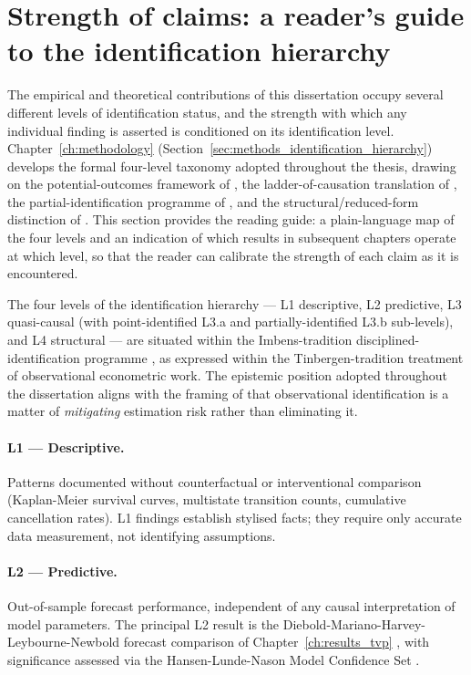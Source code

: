 \section{Strength of claims: a reader's guide to the identification hierarchy}
\label{sec:ch1-claims-structure}

The empirical and theoretical contributions of this dissertation occupy several different levels of identification status, and the strength with which any individual finding is asserted is conditioned on its identification level. Chapter~\ref{ch:methodology} (Section~\ref{sec:methods_identification_hierarchy}) develops the formal four-level taxonomy adopted throughout the thesis, drawing on the potential-outcomes framework of \cite{rubin1974estimating, holland1986statistics, imbens2015causal}, the ladder-of-causation translation of \cite{pearl2009causality, imbens2020potential}, the partial-identification programme of \cite{manski2003partial}, and the structural/reduced-form distinction of \cite{heckman2007econometric}. This section provides the reading guide: a plain-language map of the four levels and an indication of which results in subsequent chapters operate at which level, so that the reader can calibrate the strength of each claim as it is encountered.

The four levels of the identification hierarchy --- L1 descriptive, L2 predictive, L3 quasi-causal (with point-identified L3.a and partially-identified L3.b sub-levels), and L4 structural --- are situated within the Imbens-tradition disciplined-identification programme \cite{imbens2018causal}, as expressed within the Tinbergen-tradition treatment of observational econometric work. The epistemic position adopted throughout the dissertation aligns with the framing of \cite{blasques2024mitigating} that observational identification is a matter of \emph{mitigating} estimation risk rather than eliminating it.

\paragraph{L1 --- Descriptive.} Patterns documented without counterfactual or interventional comparison (Kaplan-Meier survival curves, multistate transition counts, cumulative cancellation rates). L1 findings establish stylised facts; they require only accurate data measurement, not identifying assumptions.

\paragraph{L2 --- Predictive.} Out-of-sample forecast performance, independent of any causal interpretation of model parameters. The principal L2 result is the Diebold-Mariano-Harvey-Leybourne-Newbold forecast comparison of Chapter~\ref{ch:results_tvp} \cite{diebold1995comparing, harvey1997testing}, with significance assessed via the Hansen-Lunde-Nason Model Confidence Set \cite{hansen2011model}.

